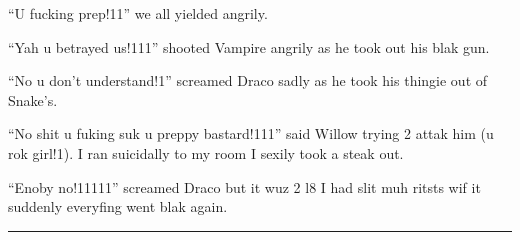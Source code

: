 \enquote{U fucking prep!11} we all yielded angrily.

\enquote{Yah u betrayed us!111} shooted Vampire angrily as he took out his blak gun.

\enquote{No u don't understand!1} screamed Draco sadly as he took his thingie out of Snake's.

\enquote{No shit u fuking suk u preppy bastard!111} said Willow trying 2 attak him (u rok girl!1). I ran suicidally to my room I sexily took a steak out.

\enquote{Enoby no!11111} screamed Draco but it wuz 2 l8 I had slit muh ritsts wif it suddenly everyfing went blak again.

\par\nobreak\vspace{1em}\noindent
\rule{1in}{0.4pt}

\begin{sloppypar}
    \noindent{}
\end{sloppypar}